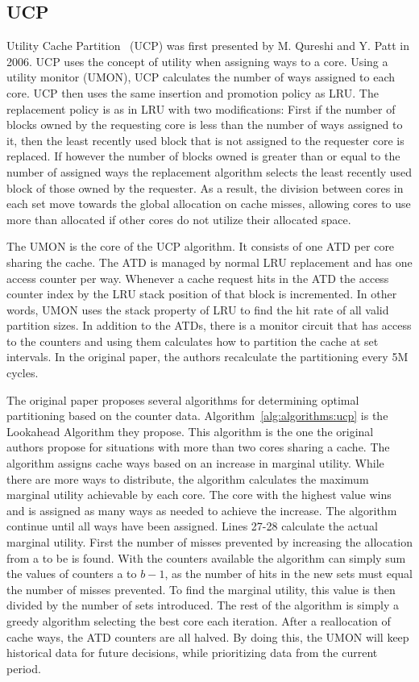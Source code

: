 \subsection{UCP}
\label{sec:algorithms:ucp}

Utility Cache Partition~\cite{Qureshi2006} (UCP) was first presented by M. Qureshi and Y. Patt in 2006. 
UCP uses the concept of utility when assigning ways to a core.
Using a utility monitor (UMON), UCP calculates the number of ways assigned to each core.
UCP then uses the same insertion and promotion policy as LRU.
The replacement policy is as in LRU with two modifications:
First if the number of blocks owned by the requesting core is less than the number of ways assigned to it, then the least recently used block that is not assigned to the requester core is replaced.
If however the number of blocks owned is greater than or equal to the number of assigned ways the replacement algorithm selects the  least recently used block of those owned by the requester.
As a result, the division between cores in each set move towards the global allocation on cache misses, allowing cores to use more than allocated if other cores do not utilize their allocated space.

The UMON is the core of the UCP algorithm.
It consists of one ATD per core sharing the cache. 
The ATD is managed by normal LRU replacement and has one access counter per way.
Whenever a cache request hits in the ATD the access counter index by the LRU stack position of that block is incremented.
In other words, UMON uses the stack property of LRU to find the hit rate of all valid partition sizes.
In addition to the ATDs, there is a monitor circuit that has access to the counters and using them calculates how to partition the cache at set intervals. 
In the original paper, the authors recalculate the partitioning every 5M cycles.

The original paper proposes several algorithms for determining optimal partitioning based on the counter data. 
Algorithm~\ref{alg:algorithms:ucp} is the Lookahead Algorithm they propose.
This algorithm is the one the original authors propose for situations with more than two cores sharing a cache.
The algorithm assigns cache ways based on an increase in marginal utility.
While there are more ways to distribute, the algorithm calculates the maximum marginal utility achievable by each core. 
The core with the highest value wins and is assigned as many ways as needed to achieve the increase.
The algorithm continue until all ways have been assigned.
Lines 27-28 calculate the actual marginal utility. 
First the number of misses prevented by increasing the allocation from a to be is found.
With the counters available the algorithm can simply sum the values of counters a to $b-1$, as the number of hits in the new sets must equal the number of misses prevented.
To find the marginal utility, this value is then divided by the number of sets introduced.
The rest of the algorithm is simply a greedy algorithm selecting the best core each iteration.
After a reallocation of cache ways, the ATD counters are all halved.
By doing this, the UMON will keep historical data for future decisions, while prioritizing data from the current period.

